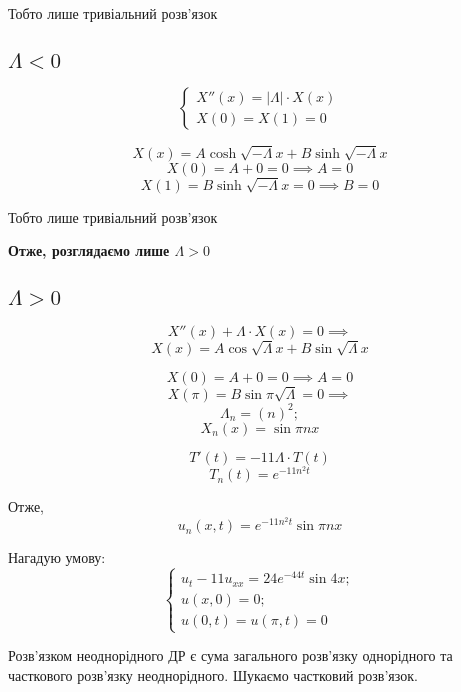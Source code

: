 \documentclass[11pt, a4paper]{article} %
\begin{document}
Тобто лише тривіальний розв'язок

\subsection*{$\Lambda<0$}

$$
    \begin{cases}
        X''(x) = |\Lambda| \cdot X(x)\\
        X(0) = X(1) = 0
    \end{cases}
$$


$$X(x) = A \cosh \sqrt{-\Lambda}x + B \sinh \sqrt{-\Lambda}x$$
$$X(0) = A + 0 = 0 \implies A = 0$$
$$X(1) = B \sinh \sqrt{-\Lambda}x = 0 \implies B = 0$$

Тобто лише тривіальний розв'язок

\textbf{Отже, розглядаємо лише $\Lambda > 0$}

\subsection*{$\Lambda > 0$}

$$X''(x) + \Lambda \cdot X(x) = 0 \implies$$
\begin{equation}
    X(x) = A \cos \sqrt{\Lambda}x + B \sin \sqrt{\Lambda}x
\end{equation}


$$X(0) = A + 0 = 0 \implies A = 0$$
$$X(\pi) = B \sin \pi\sqrt{\Lambda} = 0 \implies$$
\begin{equation}
    \Lambda_n = (n)^2;
\end{equation}
\begin{equation}
    X_n(x) = \sin \pi n x
\end{equation}

$$T'(t) = - 11 \Lambda \cdot T(t)$$
\begin{equation}
    T_n(t) = e^{-11 n^2 t}
\end{equation}

Отже,
\begin{equation}
    u_n(x,t) = e^{-11 n^2 t} \sin \pi n x
\end{equation}

Нагадую умову:
$$
\begin{cases}
    u_t - 11u_{xx} = 24e^{-44t}\sin 4x;\\
    u(x,0) = 0;\\
    u(0,t) = u(\pi,t) = 0
\end{cases}  
$$

Розв'язком неоднорідного ДР є сума загального розв'язку однорідного та часткового розв'язку неоднорідного.
Шукаємо частковий розв'язок.
\end{document}
